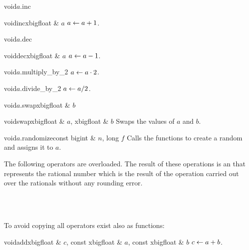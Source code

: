 \begin{fcode}{void}{$a$.inc}{}\end{fcode}
\begin{fcode}{void}{inc}{xbigfloat & $a$}
  $a \leftarrow a + 1$.
\end{fcode}

\begin{fcode}{void}{$a$.dec}{}\end{fcode}
\begin{fcode}{void}{dec}{xbigfloat & $a$}
  $a \leftarrow a - 1$.
\end{fcode}

\begin{fcode}{void}{$a$.multiply_by_2}{}
  $a \leftarrow a \cdot 2$.
\end{fcode}

\begin{fcode}{void}{$a$.divide_by_2}{}
  $a \leftarrow a / 2$.
\end{fcode}

\begin{fcode}{void}{$a$.swap}{xbigfloat & $b$}\end{fcode}
\begin{fcode}{void}{swap}{xbigfloat & $a$, xbigfloat & $b$}
  Swaps the values of $a$ and $b$.
\end{fcode}

\begin{fcode}{void}{$a$.randomize}{const bigint & $n$, long $f$}
  Calls the  functions  to create a random
   and assigns it to $a$.
\end{fcode}



\ARTH

The following operators are overloaded.  The result of these operations is an 
that represents the rational number which is the result of the operation carried out over the
rationals without any rounding error.

\begin{center}
  \\
  \\
\end{center}

To avoid copying all operators exist also as functions:

\begin{fcode}{void}{add}{xbigfloat & $c$, const xbigfloat & $a$, const xbigfloat & $b$}
  $c \leftarrow a + b$.
\end{fcode}

